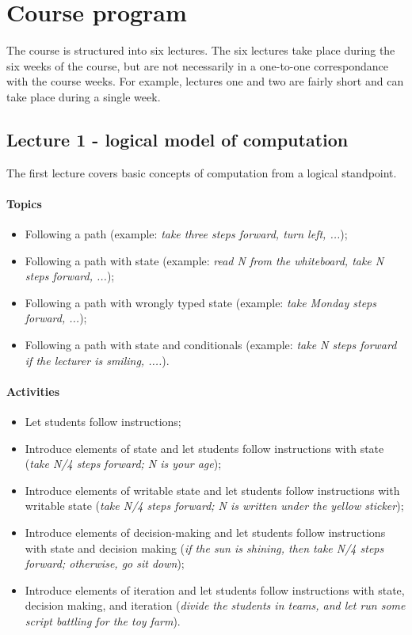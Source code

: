 \section{Course program}
	The course is structured into six lectures. The six lectures take place during the six weeks of the course, but are not necessarily in a one-to-one correspondance with the course weeks. For example, lectures one and two are fairly short and can take place during a single week.

	\subsection{Lecture 1 - logical model of computation}
		The first lecture covers basic concepts of computation from a logical standpoint.

		\paragraph*{Topics}
			\begin{itemize}
				\item Following a path (example: \textit{take three steps forward, turn left, ...});
				\item Following a path with state (example: \textit{read N from the whiteboard, take N steps forward, ...});
				\item Following a path with wrongly typed state (example: \textit{take Monday steps forward, ...});
				\item Following a path with state and conditionals (example: \textit{take N steps forward if the lecturer is smiling, ....}).
			\end{itemize}

		\paragraph*{Activities}
			\begin{itemize}
				\item Let students follow instructions;
				\item Introduce elements of state and let students follow instructions with state (\textit{take N/4 steps forward; N is your age});
				\item Introduce elements of writable state and let students follow instructions with writable state (\textit{take N/4 steps forward; N is written under the yellow sticker});
				\item Introduce elements of decision-making and let students follow instructions with state and decision making (\textit{if the sun is shining, then take N/4 steps forward; otherwise, go sit down});
				\item Introduce elements of iteration and let students follow instructions with state, decision making, and iteration (\textit{divide the students in teams, and let run some script battling for the toy farm}).
			\end{itemize}

